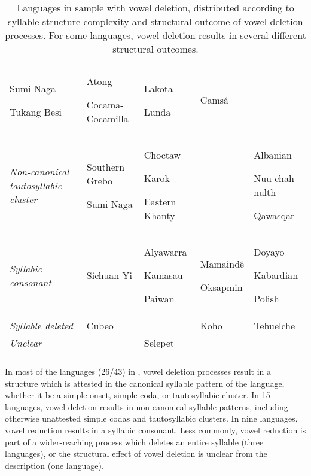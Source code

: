 \begin{table}
\begin{tabularx}{\textwidth}{XXXXX}
Sumi Naga

Tukang Besi & Atong

Cocama-Cocamilla & Lakota

Lunda & Camsá\\
\textit{Non-canonical tautosyllabic cluster} & Southern Grebo

Sumi Naga & Choctaw

Karok

Eastern Khanty &  & Albanian

Nuu-chah-nulth

Qawasqar\\
\textit{Syllabic consonant} & Sichuan Yi & Alyawarra

Kamasau

Paiwan & Mamaindê

Oksapmin & Doyayo

Kabardian

Polish\\
\textit{Syllable deleted} & Cubeo &  & Koho & Tehuelche\\
\textit{Unclear} &  & Selepet &  & \\
\lspbottomrule
\end{tabularx}
\caption{\label{tab:6.9}Languages in sample with vowel deletion, distributed according to syllable structure complexity and structural outcome of vowel deletion processes. For some languages, vowel deletion results in several different structural outcomes.}
\end{table}

  In most of the languages (26/43) in , vowel deletion processes result in a structure which is attested in the canonical syllable pattern of the language, whether it be a simple onset, simple coda, or tautosyllabic cluster. In 15 languages, vowel deletion results in non-canonical syllable patterns, including otherwise unattested simple codas and tautosyllabic clusters. In nine languages, vowel reduction results in a syllabic consonant. Less commonly, vowel reduction is part of a wider-reaching process which deletes an entire syllable (three languages), or the structural effect of vowel deletion is unclear from the description (one language).

